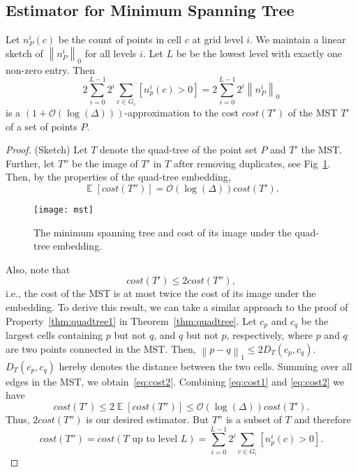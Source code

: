 \documentclass[11pt]{article}
\DeclareMathOperator*{\E}{\mathbb{E}}
\renewcommand{\O}{\mathcal{O}}
\newcommand{\norm}[1]{\left\lVert {#1} \right\rVert}
\begin{document}
\subsection{Estimator for Minimum Spanning Tree}
Let $n_P^i(c)$ be the count of points in cell $c$ at grid level $i$. We maintain a linear sketch of $\norm{n_P^i}_0$ for all levels $i$. Let $L$ be be the lowest level with exactly one non-zero entry. Then 
\begin{equation*}
	2 \sum_{i=0}^{L-1} 2^i \sum_{c \in G_i} \left[ n_p^i(c) > 0 \right] = 2 \sum_{i=0}^{L-1} 2^i \norm{n_P^i}_0
\end{equation*}
is a $(1 + \O(\log(\Delta)))$-approximation to the cost $cost(T')$ of the MST $T'$ of a set of points $P$.

\begin{proof} (Sketch)
Let $T$ denote the quad-tree of the point set $P$ and $T'$ the MST. Further, let $T''$ be the image of $T'$ in $T$ after removing duplicates, see Fig~\ref{fig:mst}. Then, by the properties of the quad-tree embedding, 
\begin{equation} \label{eq:cost1}
	\E[cost(T'')] = \O(\log(\Delta)) cost(T').
\end{equation}

\begin{figure}
	\centering
	\texttt{[image: mst]}
	\caption{The minimum spanning tree and cost of its image under the quad-tree embedding.}
	\label{fig:mst}
\end{figure}

Also, note that 
\begin{equation} \label{eq:cost2}
	cost(T') \le 2 cost(T''),
\end{equation}
i.e., the cost of the MST is at most twice the cost of its image under the embedding. To derive this result, we can take a similar approach to the proof of Property~\ref{thm:quadtree1} in Theorem~\ref{thm:quadtree}. Let $c_p$ and $c_q$ be the largest cells containing $p$ but not $q$, and $q$ but not $p$, respectively, where $p$ and $q$ are two points connected in the MST.  Then, $\norm{p - q}_1 \le 2 D_T(c_p,c_q)$. $D_T(c_p,c_q)$ hereby denotes the distance between the two cells. Summing over all edges in the MST, we obtain~\eqref{eq:cost2}. Combining \eqref{eq:cost1} and \eqref{eq:cost2} we have 
\begin{equation*}
	cost(T') \le 2 \E[cost(T'')] \le \O(\log(\Delta)) cost(T').
\end{equation*}
Thus, $2 cost(T'')$ is our desired estimator. But $T''$ is a subset of $T$ and therefore
\begin{equation*}
	cost(T'') = cost(\text{$T$ up to level $L$}) = \sum_{i=0}^{L-1} 2^i \sum_{c \in G_i} \left[ n_p^i(c) > 0 \right].
\end{equation*}
\end{proof}
\end{document}
